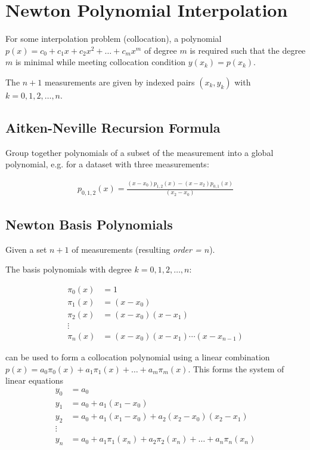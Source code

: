 \section{Newton Polynomial Interpolation}

For some interpolation problem (collocation), a polynomial
$p(x) = c_0 + c_1x + c_2x^2 + \ldots + c_mx^m$
of degree $m$ is required such that the degree $m$ is minimal while meeting collocation condition $y(x_k)=p(x_k)$.

The $n+1$ measurements are given by indexed pairs $(x_k,y_k)$ with $k=0,1,2,\ldots,n$.

\subsection{Aitken-Neville Recursion Formula}

Group together polynomials of a subset of the measurement into a global polynomial, e.g. for a dataset with three measurements:

\begin{align*}
    p_{0,1,2}(x)=\frac{(x-x_0)p_{1,2}(x) - (x-x_2)p_{0,1}(x)}{(x_2-x_0)}
\end{align*}

\subsection{Newton Basis Polynomials}
Given a set $n+1$ of measurements (resulting \emph{order = $n$}).

The basis polynomials with degree $k=0,1,2,\ldots,n$:

\begin{snugshade*}
    \begin{align*}
        \pi_0(x) & = 1 \\
        \pi_1(x) & = (x-x_0) \\
        \pi_2(x) & = (x-x_0)(x-x_1) \\
        \vdots \\
        \pi_n(x) & = (x-x_0)(x-x_1)\cdots(x-x_{n-1})
    \end{align*}
\end{snugshade*}

can be used to form a collocation polynomial using a linear combination
$p(x)=a_0\pi_0(x) + a_1\pi_1(x) + \ldots + a_m\pi_m(x)$.
This forms the system of linear equations
\begin{align*}
    y_0 & = a_0 \\
    y_1 & = a_0 + a_1(x_1-x_0) \\
    y_2 & = a_0 + a_1(x_1-x_0) + a_2(x_2-x_0)(x_2-x_1) \\
    \vdots \\
    y_n & = a_0+a_1\pi_1(x_n)+a_2\pi_2(x_n)+\ldots+a_n\pi_n(x_n)
\end{align*}

